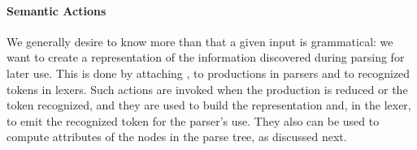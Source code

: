 \paragraph{Semantic Actions}
We generally desire to know more than that a given input is grammatical: we want to create a representation of the information discovered during parsing for later use. This is done by attaching , to productions in parsers and to recognized tokens in lexers. Such actions are invoked when the production is reduced or the token recognized, and they are used to build the representation and, in the lexer, to emit the recognized token for the parser's use. They also can be used to compute attributes of the nodes in the parse tree, as discussed next.

